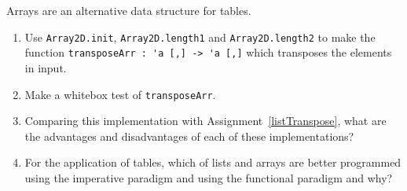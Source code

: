 \label{arr2D}Arrays are an alternative data structure for tables.
\begin{enumerate}
\item Use \lstinline{Array2D.init}, \lstinline{Array2D.length1} and \lstinline{Array2D.length2} to make the function \lstinline{transposeArr : 'a [,] -> 'a [,]} which transposes the elements in input.
\item Make a whitebox test of \lstinline{transposeArr}.
\item Comparing this implementation with Assignment~\ref{listTranspose}, what are the advantages and disadvantages of each of these implementations?
\item For the application of tables, which of lists and arrays are better programmed using the imperative paradigm and using the functional paradigm and why?
\end{enumerate}
